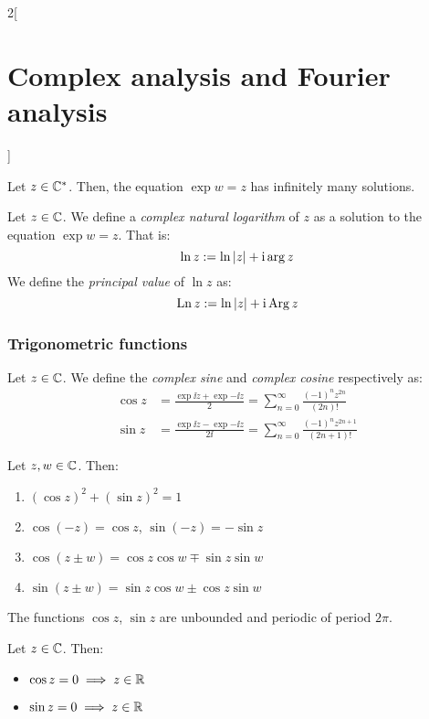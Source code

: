 \documentclass[../../../main.tex]{subfiles}
\begin{document}
\begin{multicols}{2}[\section{Complex analysis and Fourier analysis}]
\begin{theorem}
  \end{theorem}
  \begin{proposition}
    Let $z\in\mathbb{C}^*$. Then, the equation $\exp{w}=z$ has infinitely many solutions.
  \end{proposition}
  \begin{definition}
    Let $z\in \mathbb{C}$. We define a \emph{complex natural logarithm} of $z$ as a solution to the equation $\exp{w}=z$. That is: $$\ln z:=\ln \abs{z}+\mathrm{i}\arg z$$
    We define the \emph{principal value} of $\ln z$ as: $$\operatorname{Ln} z:=\ln \abs{z}+\mathrm{i}\operatorname{Arg} z$$
  \end{definition}
  \subsubsection{Trigonometric functions}
  \begin{definition}
    Let $z\in \mathbb{C}$. We define the \emph{complex sine} and \emph{complex cosine} respectively as:
    \begin{align*}
      \cos z & =\frac{\exp{\ii z}+\exp{-\ii z}}{2}=\sum_{n=0}^\infty\frac{(-1)^nz^{2n}}{(2n)!}        \\
      \sin z & =\frac{\exp{\ii z}-\exp{-\ii z}}{2\ii}=\sum_{n=0}^\infty\frac{(-1)^nz^{2n+1}}{(2n+1)!}
    \end{align*}
  \end{definition}
  \begin{proposition}
    Let $z,w\in\mathbb{C}$. Then:
    \begin{enumerate}
      \item ${\left(\cos z\right)}^2+{\left(\sin z\right)}^2=1$
      \item $\cos(-z)=\cos z$, $\sin(-z)=-\sin z$
      \item $\cos(z \pm w) = \cos z \cos w \mp \sin z \sin w$
      \item $\sin(z \pm w) = \sin z \cos w \pm \cos z \sin w$
    \end{enumerate}
  \end{proposition}
  \begin{proposition}
    The functions $\cos z$, $\sin z$ are unbounded and periodic of period $2\pi$.
  \end{proposition}
  \begin{proposition}
    Let $z\in \mathbb{C}$. Then:
    \begin{itemize}
      \item $\cos z=0\implies z\in\mathbb{R}$
      \item $\sin z=0\implies z\in\mathbb{R}$
    \end{itemize}

\end{proposition}
\end{multicols}
\end{document}

